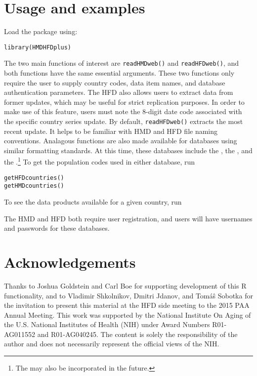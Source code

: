 \documentclass{article}
\begin{document}
\section{Usage and examples}
Load the package using:
\begin{verbatim}
library(HMDHFDplus)
\end{verbatim}
The two main functions of interest are \texttt{readHMDweb()} and
\texttt{readHFDweb()}, and both functions have the same essential
arguments. These two functions only require the user to supply country codes,
data item names, and database authentication parameters. The HFD also allows
users to extract data from former updates, which may be useful for
strict replication purposes. In order to make use of this feature, users must
note the 8-digit date code associated with the specific country series
update. By default, \texttt{readHFDweb()} extracts the most recent update. It
helps to be familiar with HMD and HFD file naming conventions. Analagous functions are also made
available for databases using similar formatting standards. At this time, these
databases include the \citet{JMD}, the \citet{CHMD}, and the
\citet{HFC}.\footnote{The \citet{HLD} may also be
incorporated in the future.} To get the population codes used in either database, run
\begin{verbatim}
getHFDcountries()
getHMDcountries()
\end{verbatim}
To see the data products available for a given country, run

The HMD and HFD both require user registration, and users will have usernames
and passwords for these databases.

\section{Acknowledgements}
Thanks to Joshua Goldstein and Carl Boe for supporting development of this R
functionality, and to Vladimir Shkolnikov, Dmitri Jdanov, and Tom\'{a}\^{s}
Sobotka for the invitation to present this material at the HFD side meeting to
the 2015 PAA Annual Meeting.
This work was supported by the National Institute On Aging of the U.S. National Institutes of Health (NIH) under Award Numbers R01-AG011552 and R01-AG040245. The content is solely the responsibility of the
author and does not necessarily represent the official views of the NIH.


   
\end{document}
